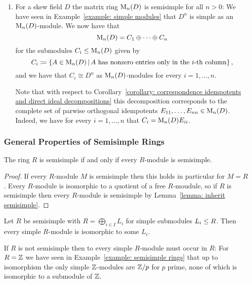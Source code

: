 \begin{example}
\begin{enumerate}
    \item
      For a skew field $D$ the matrix ring $\operatorname{M}_n(D)$ is semisimple for all $n > 0$:
      We have seen in Example~\ref{example: simple modules} that $D^n$ is simple as an $\operatorname{M}_n(D)$-module.
      We now have that
      \[
          \operatorname{M}_n(D)
        = C_1 \oplus \dotsb \oplus C_n
      \]
      for the submodules $C_i \leq \operatorname{M}_n(D)$ given by 
      \[
                  C_i
        \defined  \{
                    A \in \Mat_n(D)
                  \suchthat
                    \text{$A$ has nonzero entries only in the $i$-th column}
                  \} \,,
      \]
      and we have that $C_i \cong D^n$ as $\operatorname{M}_n(D)$-modules for every $i = 1, \dotsc, n$.
      
      Note that with respect to Corollary~\ref{corollary: correspondence idempotents and direct ideal decompositions} this decomposition corresponds to the complete set of parwise orthogonal idempotents $E_{11}, \dotsc, E_{nn} \in \operatorname{M}_n(D)$.
      Indeed, we have for every $i = 1, \dotsc, n$ that $C_i = \operatorname{M}_n(D) E_{ii}$.
  \end{enumerate}
\end{example}



\subsubsection{General Properties of Semisimple Rings}


\begin{proposition}
  The ring $R$ is semisimple if and only if every $R$-module is semisimple.
\end{proposition}


\begin{proof}
  If every $R$-module $M$ is semisimple then this holds in particular for $M = R$.
  Every $R$-module is isomorphic to a quotient of a free $R$-moudule, so if $R$ is semisimple then every $R$-module is semisimple by Lemma~\ref{lemma: inherit semisimple}.
\end{proof}


\begin{lemma}
  \label{lemma: simple module of semisimple ring is direct summand}
  Let $R$ be semisimple with $R = \bigoplus_{i \in I} L_i$ for simple submodules $L_i \leq R$.
  Then every simple $R$-module is isomorphic to some $L_i$.
\end{lemma}


\begin{warning}
  \label{warning: non ss ring does not have to contain simple modules}
  If $R$ is not semisimple then to every simple $R$-module must occur in $R$:
  For $R = \mathbb{Z}$ we have seen in Example~\ref{example: semisimple rings} that up to isomorphism the only simple $\mathbb{Z}$-modules are $\mathbb{Z}/p$ for $p$ prime, none of which is isomorphic to a submodule of $\mathbb{Z}$.
\end{warning}


